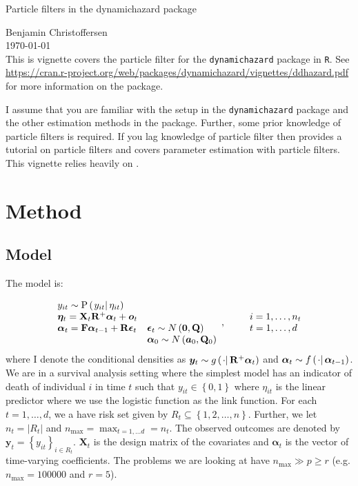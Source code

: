 \documentclass[9pt, notitlepage]{article}
\renewcommand{\vec}[1]{\bm{#1}}
\newcommand{\mat}[1]{\mathbf{#1}}
\newcommand{\Lbrace}[1]{\left\{ #1\right\}}
\newcommand{\Lparen}[1]{\left( #1\right)}
\newcommand{\Cond}[2]{\left. #1 \vphantom{#2} \right\vert  #2}
\newcommand{\Prob}{\text{P}}
\newcommand{\optor}[2]{#1\Lparen{#2}}
\newcommand{\optorC}[3]{\optor{#1}{\Cond{#2}{#3}}}
\newcommand{\propC}[2]{\optorC{\Prob}{#1}{#2}}
\newcommand{\dimState}{p}
\newcommand{\dimRng}{r}
\newcommand{\nPeriods}{d}
\newcommand{\nMax}{n_{\text{max}}}
\newcommand*{\myTitle}{\begingroup
\centering
{\LARGE Particle filters in the dynamichazard package} \\[\baselineskip]
\scshape

Benjamin Christoffersen \\[\baselineskip]
\today \\[\baselineskip]
\vspace*{3\baselineskip}
\endgroup}
\begin{document}
\myTitle
This is vignette covers the particle filter for the \verb|dynamichazard| package in \verb|R|. See \url{https://cran.r-project.org/web/packages/dynamichazard/vignettes/ddhazard.pdf} for more information on the package.

I assume that you are familiar with the setup in the \verb|dynamichazard| package and the other estimation methods in the package. Further, some prior knowledge of particle filters is required.  If you lag knowledge of particle filter then \cite{doucet09} provides a tutorial on particle filters and \cite{kantas15} covers parameter estimation with particle filters. This vignette relies heavily on \cite{fearnhead10}.

\section{Method}
\subsection*{Model}
The model is:

\begin{equation}
\begin{array}{ll}
 	y_{it} \sim \propC{y_{it}}{\eta_{it}} &  \\
%
 	\vec{\eta}_{t} = \mat{X}_t\mat{R}^{+}\vec{\alpha}_t + \vec{o}_t \\
%
 	\vec{\alpha}_t = \mat{F}\vec{\alpha}_{t - 1} + \mat{R}\vec{\epsilon}_t &
 		\vec{\epsilon}_t \sim N\Lparen{\vec{0}, \mat{Q}} \\
%
	&	\vec{\alpha}_0 \sim N\Lparen{\vec{a}_0, \mat{Q}_0}
\end{array}, \qquad
%
\begin{array}{l} i = 1, \dots, n_t \\ t = 1, \dots, d \end{array}
%
\end{equation}%
%
where I  denote the conditional densities as $\vec{y}_t \sim \optorC{g}{\cdot}{\mat{R}^{+}\vec{\alpha}_t}$ and $\vec{\alpha}_t \sim \optorC{f}{\cdot}{\vec{\alpha}_{t-1}}$. We are in a survival analysis setting where the simplest model has an indicator of death of individual $i$ in time $t$ such that $y_{it} \in \Lbrace{0, 1}$ where $\eta_{it}$ is the linear predictor where we use the logistic function as the link function. For each $t=1,\dots,\nPeriods$, we a have risk set given by $R_t \subseteq \Lbrace{1,2,\dots,n}$. Further, we let $n_t = \vert R_t \vert$ and $\nMax = \max_{t = 1,\dots \nPeriods} = n_t$. The observed outcomes are denoted by $\vec{y}_t = \Lbrace{y_{it}}_{i \in R_t}$. $\mat{X}_t$ is the design matrix of the covariates and $\vec{\alpha}_t$ is the vector of time-varying coefficients. The problems we are looking at have $\nMax \gg \dimState \geq \dimRng$ (e.g. $\nMax = 100000$ and $\dimRng = 5$).
\end{document}
